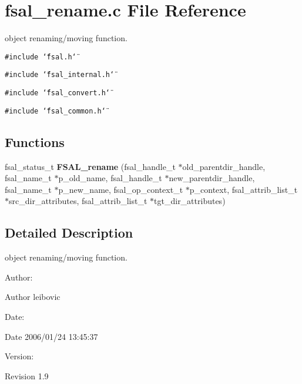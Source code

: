 \section{fsal\_\-rename.c File Reference}
\label{fsal__rename_8c}
object renaming/moving function. 

{\tt \#include \char`\"{}fsal.h\char`\"{}}\par
{\tt \#include \char`\"{}fsal\_\-internal.h\char`\"{}}\par
{\tt \#include \char`\"{}fsal\_\-convert.h\char`\"{}}\par
{\tt \#include \char`\"{}fsal\_\-common.h\char`\"{}}\par
\subsection*{Functions}
\begin{CompactItemize}
\item 
fsal\_\-status\_\-t {\bf FSAL\_\-rename} (fsal\_\-handle\_\-t $\ast$old\_\-parentdir\_\-handle, fsal\_\-name\_\-t $\ast$p\_\-old\_\-name, fsal\_\-handle\_\-t $\ast$new\_\-parentdir\_\-handle, fsal\_\-name\_\-t $\ast$p\_\-new\_\-name, fsal\_\-op\_\-context\_\-t $\ast$p\_\-context, fsal\_\-attrib\_\-list\_\-t $\ast$src\_\-dir\_\-attributes, fsal\_\-attrib\_\-list\_\-t $\ast$tgt\_\-dir\_\-attributes)
\end{CompactItemize}


\subsection{Detailed Description}
object renaming/moving function. 

\begin{Desc}
\item[Author:]\begin{Desc}
\item[Author]leibovic \end{Desc}
\end{Desc}
\begin{Desc}
\item[Date:]\begin{Desc}
\item[Date]2006/01/24 13:45:37 \end{Desc}
\end{Desc}
\begin{Desc}
\item[Version:]\begin{Desc}
\item[Revision]1.9 \end{Desc}
\end{Desc}


